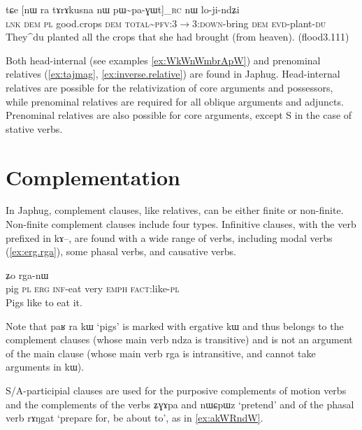 \documentclass[oldfontcommands,oneside,a4paper,11pt]{article}
\newcommand{\ipa}[1]{{\phon #1}} %
\newcommand{\topic}{\textsc{dem}}
\begin{document}
  \begin{exe}
\ex \label{ex:pWpaGWt}
\gll
\ipa{tɕe}  	[\ipa{nɯ} \ipa{ra}  	\ipa{tɤrɤkusna} 	\ipa{nɯ}  	\ipa{pɯ\textasciitilde{}pa-ɣɯt}]_{\textsc{rc}}  	\ipa{nɯ}  	\ipa{lo-ji-ndʑi}  \\
\textsc{lnk} \textsc{dem} \textsc{pl} good.crops \topic{} \textsc{total\textasciitilde{}pfv:3$\rightarrow$3:down}-bring \topic{} \textsc{evd}-plant-\textsc{du} \\
\glt They^{du} planted all the crops that she had brought (from heaven). (flood3.111)
\end{exe}

Both head-internal (see examples \ref{ex:WkWnWmbrApW}) and prenominal relatives (\ref{ex:tajmag}, \ref{ex:inverse.relative}) are found in Japhug. Head-internal relatives are possible for the relativization of core arguments and possessors, while prenominal relatives are required for all oblique arguments and adjuncts. Prenominal relatives are also possible for core arguments, except S in the case of stative verbs.

\section{Complementation}
In Japhug, complement clauses, like relatives, can be either finite or non-finite. Non-finite complement clauses include four types. Infinitive clauses, with the verb prefixed in \ipa{kɤ--}, are found with a wide range of verbs, including modal verbs (\ref{ex:erg.rga}), some phasal verbs, and causative verbs. 


 \begin{exe}
\ex \label{ex:erg.rga}
\gll
[\ipa{paʁ}  	\ipa{ra}  	\ipa{kɯ}  	\ipa{kɤ-ndza}]  	\ipa{wuma}  	\ipa{ʑo}  	\ipa{rga-nɯ}  \\
pig \textsc{pl} \textsc{erg} \textsc{inf}-eat very \textsc{emph} \textsc{fact}:like-\textsc{pl} \\
 \glt Pigs like to eat it.
\end{exe}

Note that \ipa{paʁ} \ipa{ra} \ipa{kɯ} `pigs' is marked with ergative \ipa{kɯ} and thus belongs to the complement clauses (whose main verb \ipa{ndza} is transitive) and is not an argument of the main clause (whose main verb \ipa{rga} is intransitive, and cannot take arguments in \ipa{kɯ}).


S/A-participial clauses are used for the purposive complements of motion verbs and the complements of the verbs \ipa{ʑɣɤpa} and \ipa{nɯɕpɯz} `pretend' and of the phasal verb \ipa{rɤŋgat} `prepare for, be about to', as in \ref{ex:akWRndW}.
\end{document}
